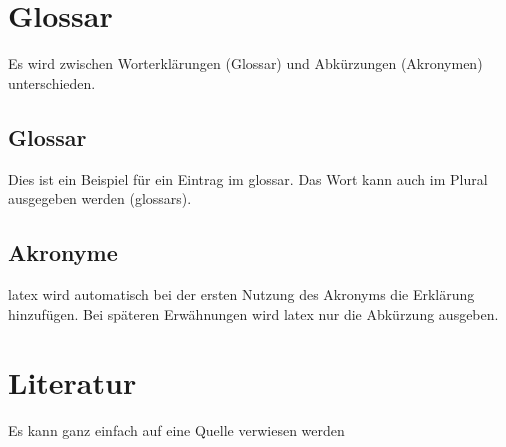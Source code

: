 \chapter{Glossar}
Es wird zwischen Worterklärungen (Glossar) und Abkürzungen (Akronymen) unterschieden.
\section{Glossar}
Dies ist ein Beispiel für ein Eintrag im \Gls{glossar}. Das Wort kann auch im Plural ausgegeben werden (\Glspl{glossar}).
\section{Akronyme}
\gls{latex} wird automatisch bei der ersten Nutzung des Akronyms die Erklärung hinzufügen. Bei späteren Erwähnungen wird \gls{latex} nur die Abkürzung ausgeben.
\chapter{Literatur}
Es kann ganz einfach auf eine Quelle verwiesen werden \autocite{blubb}